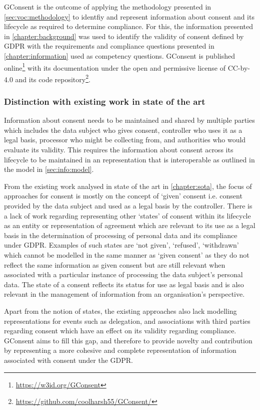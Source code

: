 GConsent is the outcome of applying the methodology presented in \autoref{sec:voc:methodology} to identfiy and represent information about consent and its lifecycle as required to determine compliance.
For this, the information presented in \autoref{chapter:background} was used to identify the validity of consent defined by GDPR with the requirements and compliance questions presented in \autoref{chapter:information} used as competency questions.
GConsent is published online\footnote{\url{https://w3id.org/GConsent}} with its documentation under the open and permissive license of CC-by-4.0 and its code repository\footnote{\url{https://github.com/coolharsh55/GConsent/}}.

\subsubsection{Distinction with existing work in state of the art}
Information about consent needs to be maintained and shared by multiple parties which includes the data subject who gives consent, controller who uses it as a legal basis, processor who might be collecting from, and authorities who would evaluate its validity. This requires the information about consent across its lifecycle to be maintained in an representation that is interoperable as outlined in the model in \autoref{sec:info:model}.

From the existing work analysed in state of the art in \autoref{chapter:sota}, the focus of approaches for consent is mostly on the concept of `given' consent i.e. consent provided by the data subject and used as a legal basis by the controller. There is a lack of work regarding representing other `states' of consent within its lifecycle as an entity or representation of agreement which are relevant to its use as a legal basis in the determination of processing of personal data and its compliance under GDPR.
Examples of such states are `not given', `refused', `withdrawn' which cannot be modelled in the same manner as `given consent' as they do not reflect the same information as given consent but are still relevant when associated with a particular instance of processing the data subject's personal data. The state of a consent reflects its status for use as legal basis and is also relevant in the management of information from an organisation's perspective.

Apart from the notion of states, the existing approaches also lack modelling representations for events such as delegation, and associations with third parties regarding consent which have an effect on its validity regarding compliance.
GConsent aims to fill this gap, and therefore to provide novelty and contribution by representing a more cohesive and complete representation of information associated with consent under the GDPR.

